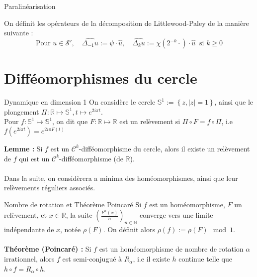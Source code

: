 \documentclass[10pt]{beamer}
\begin{document}
\begin{frame}{Paralinéarisation}

On définit les opérateurs de la décomposition de Littlewood-Paley de la manière suivante :
\[
\text{Pour } u \in \mathcal{S}', \quad \widehat{\Delta_{-1} u} := \psi \cdot \hat{u}, \quad \widehat{\Delta_{k} u} := \chi(2^{-k} \cdot) \cdot \hat{u} \ \text{ si } k \geq 0
\]

\end{frame}

\section{Difféomorphismes du cercle}
\begin{frame}{Dynamique en dimension 1}
    On considère le cercle $\mathbb{S}^1 := \left\{z, |z|=1 \right\}$, ainsi que le plongement $\Pi : \mathbb{R} \mapsto \mathbb{S}^1, t \mapsto e^{2i\pi t}$. \\
    
Pour $f:\mathbb{S}^1 \mapsto \mathbb{S}^1$, on dit que $F: \mathbb{R} \mapsto \mathbb{R}$ est un relèvement si $\Pi \circ F = f \circ \Pi$, i.e $f(e^{2i\pi t}) = e^{2i\pi F(t)}$

\textbf{Lemme :} Si $f$ est un $\mathcal{C}^k$-difféomorphisme du cercle, alors il existe un relèvement de $f$ qui est un $\mathcal{C}^k$-difféomorphisme (de $\mathbb{R}$). \\~\\

Dans la suite, on considèrera a minima des homéomorphismes, ainsi que leur relèvements réguliers associés.
\end{frame}

\begin{frame}{Nombre de rotation et Théorème Poincaré }
    Si $f$ est un homéomorphisme, $F$ un relèvement, et $x\in \mathbb{R}$, la suite $\displaystyle (\frac{F^n(x)}{n})_{n\in \mathbb{N}}$ converge vers une limite indépendante de $x$, notée $\rho(F)$. On définit alors $\rho(f):= \rho(F) \mod 1$. \\~\\
   

\textbf{Théorème (Poincaré) :} Si $f$ est un homéomorphisme de nombre de rotation $\alpha$ irrationnel, alors $f$ est semi-conjugué à $R_\alpha$, i.e il existe $h$ continue telle que $h \circ f = R_\alpha \circ h$. \\~\\

\end{frame}
\end{document}
